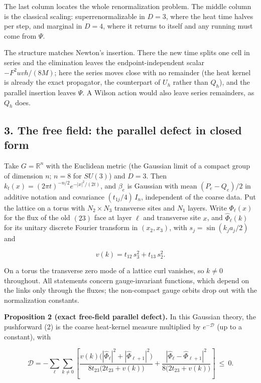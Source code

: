 \documentclass[11pt,a4paper]{article}
\begin{document}
The last column locates the whole renormalization problem. The middle
column is the classical scaling: superrenormalizable in \(D=3\), where
the heat time halves per step, and marginal in \(D=4\), where it returns
to itself and any running must come from \(\Psi\).

The structure matches Newton's insertion. There the new time splits one
cell in series and the elimination leaves the endpoint-independent
scalar \(-F^2uvh/(8M)\); here the series moves close with no remainder
(the heat kernel is already the exact propagator, the counterpart of
\(U_h\) rather than \(Q_h\)), and the parallel insertion leaves
\(\Psi\). A Wilson action would also leave series remainders, as \(Q_h\)
does.

\hypertarget{the-free-field-the-parallel-defect-in-closed-form}{%
\subsection{3. The free field: the parallel defect in closed
form}\label{the-free-field-the-parallel-defect-in-closed-form}}

Take \(G=\mathbb R^n\) with the Euclidean metric (the Gaussian limit of
a compact group of dimension \(n\); \(n=8\) for \(SU(3)\)) and \(D=3\).
Then \(k_t(x)=(2\pi t)^{-n/2}e^{-|x|^2/(2t)}\), and \(\beta_e\) is
Gaussian with mean \((P_e-Q_e)/2\) in additive notation and covariance
\((t_{1j}/4)\,I_n\), independent of the coarse data. Put the lattice on
a torus with \(N_2\times N_3\) transverse sites and \(N_1\) layers.
Write \(\Phi_\ell(x)\) for the flux of the old \((23)\) face at layer
\(\ell\) and transverse site \(x\), and \(\hat\Phi_\ell(k)\) for its
unitary discrete Fourier transform in \((x_2,x_3)\), with
\(s_j=\sin(k_ja_j/2)\) and

\[v(k)=t_{12}\,s_3^2+t_{13}\,s_2^2 .\]

On a torus the transverse zero mode of a lattice curl vanishes, so
\(k\ne0\) throughout. All statements concern gauge-invariant functions,
which depend on the links only through the fluxes; the non-compact gauge
orbits drop out with the normalization constants.

\textbf{Proposition 2 (exact free-field parallel defect).} In this
Gaussian theory, the pushforward (2) is the coarse heat-kernel measure
multiplied by \(e^{-\mathcal D}\) (up to a constant), with

\[\mathcal D=-\sum_\ell\sum_{k\ne0}\left[
\frac{v(k)\bigl(|\hat\Phi_\ell|^2+|\hat\Phi_{\ell+1}|^2\bigr)}
{8t_{23}\bigl(2t_{23}+v(k)\bigr)}
+\frac{|\hat\Phi_\ell-\hat\Phi_{\ell+1}|^2}{8\bigl(2t_{23}+v(k)\bigr)}
\right]\ \le\ 0. \tag{5}\]
\end{document}
